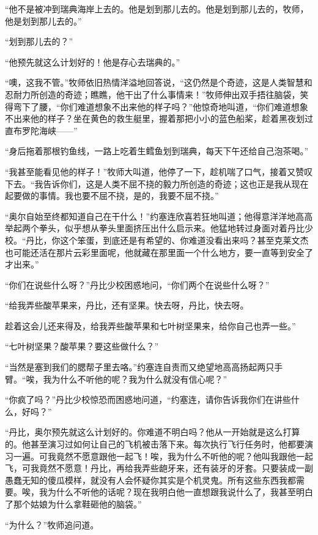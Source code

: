     “他不是被冲到瑞典海岸上去的。他是划到那儿去的。他是划到那儿去的，牧师，他是划到那儿去的。”

    “划到那儿去的？”

    “他预先就这么计划好的！他是存心去瑞典的。”

    “噢，这我不管。”牧师依旧热情洋溢地回答说，“这仍然是个奇迹，这是人类智慧和忍耐力所创造的奇迹；瞧瞧，他干出了什么事情来！”牧师伸出双手捂往脑袋，笑得弯下了腰，“你们难道想象不出来他的样子吗？”他惊奇地叫道，“你们难道想象不出来他的样子？坐在黄色的救生艇里，握着那把小小的蓝色船桨，趁着黑夜划过直布罗陀海峡——”

    “身后拖着那根钓鱼线，一路上吃着生鳕鱼划到瑞典，每天下午还给自己泡茶喝。”

    “我甚至能看见他的样子！”牧师大叫道，他停了一下，趁机喘了口气，接着又赞叹下去。“我告诉你们，这是人类不屈不挠的毅力所创造的奇迹；这也正是我从现在起要做的事情。我也要不屈不挠，是的，我要不屈不挠。”

    “奥尔自始至终都知道自己在干什么！”约塞连欣喜若狂地叫道；他得意洋洋地高高举起两个拳头，似乎想从拳头里面挤压出什么启示来。他猛地转过身面对着丹比少校。“丹比，你这个笨蛋，到底还是有希望的、你难道没看出来吗？甚至克莱文杰也可能还活在那片云彩里面呢，他就藏在那里面一个什么地方，要一直等到安全了才出来。”

    “你们在说些什么呀？”丹比少校困惑地问，“你们两个在说些什么呀？”

    “给我弄些酸苹果来，丹比，还有坚果。快去呀，丹比，快去呀。

    趁着这会儿还来得及，给我弄些酸苹果和七叶树坚果来，给你自己也弄一些。”

    “七叶树坚果？酸苹果？要这些做什么？”

    “当然是塞到我们的腮帮子里去咯。”约塞连自责而又绝望地高高扬起两只手臂。“唉，我为什么不听他的呢？我为什么就没有信心呢？”

    “你疯了吗？”丹比少校惊恐而困惑地问道，“约塞连，请你告诉我你们在讲些什么，好吗？”

    “丹比，奥尔预先就这么计划好的。你难道不明白吗？他从一开始就是这么打算的。他甚至演习过如何让自己的飞机被击落下来。每次执行飞行任务时，他都要演习一遍。可我竟然不愿意跟他一起飞！唉，我为什么不听他的呢？他叫我跟他一起飞，可我竟然不愿意！丹比，再给我弄些龅牙来，还有装牙的牙套。只要装成一副愚蠢无知的傻瓜模样，就没有人会怀疑你其实是个机灵鬼。所有这些东西我都需要。唉，我为什么不听他的话呢？现在我明白他一直想跟我说什么了，我甚至明白了那个姑娘为什么拿鞋砸他的脑袋。”

    “为什么？”牧师追问道。

